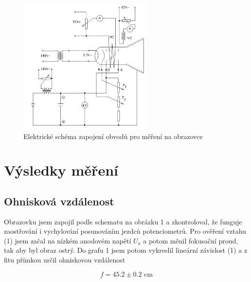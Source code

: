\documentclass[a4paper,11pt]{article}
\begin{document}
\begin{figure}[h]
    \centering
    \includegraphics[width=0.6\textwidth]{schema.jpg}
    \caption{Elektrické schéma zapojení obvodů pro měření na obrazovce}
\end{figure}

\newpage

\section{Výsledky měření}

\subsection{Ohnisková vzdálenost}

Obrazovku jsem zapojil podle schematu na obrázku 1 a zkontroloval, že funguje zaostřování i vychylování posunováním jezdců potenciometrů. Pro ověření vztahu (1) jsem začal na nízkém anodovém napětí $ U_a $ a potom měnil fokusační proud, tak aby byl obraz ostrý. Do grafu 1 jsem potom vykreslil lineární závislost (1) a z fitu přímkou určil ohniskovou vzdálenost

\begin{equation}
f = 45.2 \pm 0.2 \text{ cm}
\end{equation}
\end{document}
